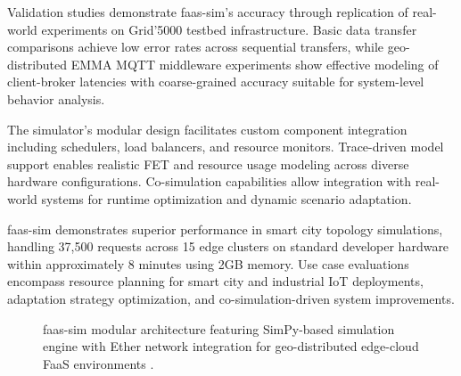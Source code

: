 Validation studies demonstrate faas-sim's accuracy through replication of real-world experiments on Grid'5000 testbed infrastructure. Basic data transfer comparisons achieve low error rates across sequential transfers, while geo-distributed EMMA MQTT middleware experiments show effective modeling of client-broker latencies with coarse-grained accuracy suitable for system-level behavior analysis.

The simulator's modular design facilitates custom component integration including schedulers, load balancers, and resource monitors. Trace-driven model support enables realistic FET and resource usage modeling across diverse hardware configurations. Co-simulation capabilities allow integration with real-world systems for runtime optimization and dynamic scenario adaptation.

faas-sim demonstrates superior performance in smart city topology simulations, handling 37,500 requests across 15 edge clusters on standard developer hardware within approximately 8 minutes using 2GB memory. Use case evaluations encompass resource planning for smart city and industrial IoT deployments, adaptation strategy optimization, and co-simulation-driven system improvements.

\begin{figure}[htbp]
\centering
{}
\caption{faas-sim modular architecture featuring SimPy-based simulation engine with Ether network integration for geo-distributed edge-cloud FaaS environments \cite{boughzala2022faassim}.}
\label{fig:faas-sim-architecture}
\end{figure}


